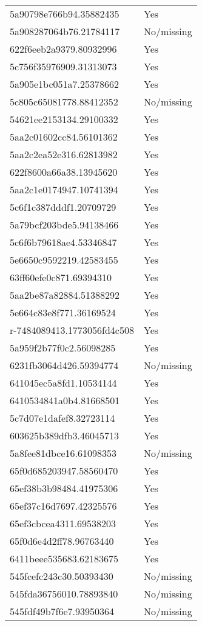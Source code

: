 \begin{tabular}{ll}
5a90798e766b94.35882435 & Yes \\
5a908287064b76.21784117 & No/missing \\
622f6eeb2a9379.80932996 & Yes \\
5c756f35976909.31313073 & Yes \\
5a905e1bc051a7.25378662 & Yes \\
5c805c65081778.88412352 & No/missing \\
54621ee2153134.29100332 & Yes \\
5aa2c01602cc84.56101362 & Yes \\
5aa2c2ea52e316.62813982 & Yes \\
622f8600a66a38.13945620 & Yes \\
5aa2c1e0174947.10741394 & Yes \\
5c6f1c387dddf1.20709729 & Yes \\
5a79bcf203bde5.94138466 & Yes \\
5c6f6b79618ae4.53346847 & Yes \\
5e6650c9592219.42583455 & Yes \\
63ff60efe0c871.69394310 & Yes \\
5aa2be87a82884.51388292 & Yes \\
5e664c83e8f771.36169524 & Yes \\
r-7484089413.1773056fd4c508 & Yes \\
5a959f2b77f0c2.56098285 & Yes \\
6231fb3064d426.59394774 & No/missing \\
641045ec5a8fd1.10534144 & Yes \\
6410534841a0b4.81668501 & Yes \\
5c7d07e1dafef8.32723114 & Yes \\
603625b389dfb3.46045713 & Yes \\
5a8fee81dbce16.61098353 & No/missing \\
65f0d685203947.58560470 & Yes \\
65ef38b3b98484.41975306 & Yes \\
65ef37c16d7697.42325576 & Yes \\
65ef3cbcea4311.69538203 & Yes \\
65f0d6e4d2ff78.96763440 & Yes \\
6411beee535683.62183675 & Yes \\
545fcefc243c30.50393430 & No/missing \\
545fda36756010.78893840 & No/missing \\
545fdf49b7f6e7.93950364 & No/missing \\

\end{tabular}
